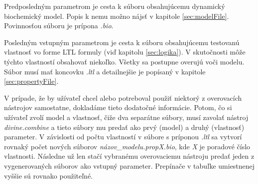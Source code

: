 \documentclass[11pt,final,oneside]{fithesis}
\begin{document}
Predposledn\'ym parametrom je cesta k s\'uboru obsahuj\'ucemu dynamic\-k\'y biochemick\'y model. Popis k nemu mo\v zno n\'ajs\v t v kapitole 
\ref{sec:modelFile}. Povinnos\v tou s\'uboru je pr\'ipona {\it .bio}.

Posledn\'ym vstupn\'ym parametrom je cesta k s\'uboru obsahuj\'ucemu testovan\'u vlastnos\v t vo forme LTL formuly (vi\v d kapitolu \ref{sec:logika}). 
V skuto\v cnosti m\^ o\v ze t\'ychto vlastnost\'i obsahova\v t nieko\v lko. V\v setky sa postupne overuj\'u vo\v ci modelu. S\'ubor mus\'i ma\v t koncovku 
{\it .ltl} a detailnej\v sie je pop\'isan\'y v kapitole \ref{sec:propertyFile}.

V pr\'ipade, \v ze by u\v z\'ivate\v l chcel alebo potreboval pou\v zi\v t niektor\'y z overovac\'ich n\'astrojov samostatne, doklad\'ame tieto 
dodato\v cn\'e inform\'acie. Potom, \v co si u\v z\'ivate\v l zvol\'i model a vlastnos\v t, \v ci\v ze dva separ\'atne s\'ubory, mus\'i zavola\v t
n\'astroj {\it divine.combine} a tieto s\'ubory mu preda\v t ako prv\'y (model) a druh\'y (vlastnos\v t) parameter. V z\'avislosti od po\v ctu vlastnost\'i
v s\'ubore s pr\'iponou {\it .ltl} sa vytvor\'i  rovnak\'y po\v cet nov\'ych s\'uborov {\it n\'azov\_modelu.propX.bio}, kde {\it X} je poradov\'e \v c\'islo
vlastnosti. N\'asledne u\v z len sta\v c\'i vybran\'emu overovaciemu n\'astroju preda\v t jeden z vygenerovan\'ych s\'uborov ako vstupn\'y parameter. 
Prep\'ina\v ce v tabu\v lke umiestnenej vy\v s\v sie s\'u rovnako pou\v zite\v ln\'e.


\end{document}
